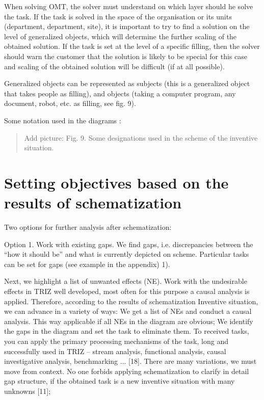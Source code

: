 \documentclass[11pt,a4paper]{book}
\newcommand{\addpicture}[1]{
  \begin{quote} Add picture: #1\end{quote}
}
\begin{document}
When solving OMT, the solver must understand on which layer should he solve
the task.  If the task is solved in the space of the organisation or its units
(department, department, site), it is important to try to find a solution on
the level of generalized objects, which will determine the further scaling of
the obtained solution.  If the task is set at the level of a specific filling,
then the solver should warn the customer that the solution is likely to be
special for this case and scaling of the obtained solution will be difficult
(if at all possible).

Generalized objects can be represented as subjects (this is a generalized
object that takes people as filling), and objects (taking a computer program,
any document, robot, etc. as filling, see fig. 9).

Some notation used in the diagrams :

\addpicture{Fig. 9. Some designations used in the scheme of the inventive
  situation.} 


\section{Setting objectives based on the results of schematization}

Two options for further analysis after schematization:

Option 1. Work with existing gaps. We find gaps, i.e.  discrepancies between
the “how it should be” and what is currently depicted on scheme. Particular
tasks can be set for gaps (see example in the appendix) 1).

Next, we highlight a list of unwanted effects (NE). Work with the undesirable
effects in TRIZ well developed, most often for this purpose a causal analysis
is applied. Therefore, according to the results of schematization Inventive
situation, we can advance in a variety of ways: We get a list of NEs and
conduct a causal analysis. This way applicable if all NEs in the diagram are
obvious; We identify the gaps in the diagram and set the task to eliminate
them. To received tasks, you can apply the primary processing mechanisms of
the task, long and successfully used in TRIZ -- stream analysis, functional
analysis, causal investigative analysis, benchmarking ... [18]. There are many
variations, we must move from context. No one forbids applying schematization
to clarify in detail gap structure, if the obtained task is a new inventive
situation with many unknowns [11];
\end{document}
